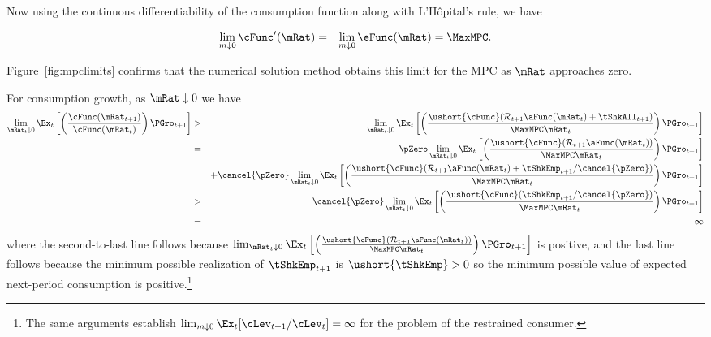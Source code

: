 \documentclass[titlepage]{\econtex}\providecommand{\texname}{BufferStockTheory}%
\begin{document}
{Now using the continuous differentiability of the consumption function
along with L'H\^opital's rule, we have
\begin{comment}
\begin{eqnarray*}
    \eFunc^{\prime}(\mRat) & = & \mRat^{-1} \cFunc^{\prime}(\mRat) - \mRat^{-2} \cFunc(\mRat)
\\ \mRat \eFunc^{\prime}(\mRat) & = & \cFunc^{\prime}(\mRat) - \cFunc(\mRat)/\mRat
\\ \cFunc^{\prime}(\mRat) & = & \eFunc(\mRat)+ \mRat \eFunc^{\prime}(\mRat)
\end{eqnarray*}
and since $0<\eFunc(\mRat)<1$ we have
\end{comment}
\begin{eqnarray}
  \lim_{m \downarrow 0} \cFunc^{\prime}(\mRat) & = & \lim_{m \downarrow 0}
  \eFunc(\mRat) = \MaxMPC. \nonumber
\end{eqnarray}

Figure~\ref{fig:mpclimits} confirms that the numerical solution method
obtains this limit for the MPC as $\mRat$ approaches zero.

For consumption growth, as $\mRat \downarrow 0$ we have
\begin{eqnarray*}
\lim_{\mRat_{t} \downarrow 0} \Ex_{t}\left[\left(\frac{\cFunc({\mRat}_{t+1})}{\cFunc(\mRat_t)}\right){\PGro}_{t+1}\right]
& > & \lim_{\mRat_{t} \downarrow 0} \Ex_{t}\left[\left(\frac{\ushort{\cFunc}({\mathcal{\mathcal{R}}}_{t+1}\aFunc(\mRat_{t})+{%
\tShkAll}_{t+1})}{\MaxMPC \mRat_{t}}\right){\PGro}_{t+1}\right]  \notag \\
& = & \phantom{+}\pZero \lim_{\mRat_{t} \downarrow 0} \Ex_{t}\left[\left(\frac{\ushort{\cFunc}({\mathcal{\mathcal{R}}}_{t+1}\aFunc(\mRat_{t}))}{\MaxMPC \mRat_{t}}\right){\PGro}_{t+1}\right] \\
& & + \cancel{\pZero} \lim_{\mRat_{t} \downarrow 0}  \Ex_{t}\left[\left(\frac{\ushort{\cFunc}({\mathcal{\mathcal{R}}}_{t+1}\aFunc(\mRat_{t})+
\tShkEmp_{t+1}/\cancel{\pZero})}{\MaxMPC \mRat_{t}}\right){\PGro}_{t+1}\right]  \\\notag
& > & \cancel{\pZero} \lim_{\mRat_{t} \downarrow 0} \Ex_{t}\left[\left(\frac{\ushort{\cFunc}(
\tShkEmp_{t+1}/\cancel{\pZero})}{\MaxMPC \mRat_{t}}\right){\PGro}_{t+1}\right] \\
& = & \infty \nonumber
\end{eqnarray*}
where the second-to-last line follows because  $\lim_{\mRat_{t} \downarrow 0} \Ex_{t}\left[\left(\frac{\ushort{\cFunc}({\mathcal{\mathcal{R}}}_{t+1}\aFunc(\mRat_{t}))}{\MaxMPC \mRat_{t}}\right){\PGro}_{t+1}\right]$ is positive, and the last line follows because the minimum possible realization of $\tShkEmp_{t+1}$ is $\ushort{\tShkEmp}>0$ so the minimum possible value of expected next-period consumption is positive.\footnote{
The same arguments establish $\lim_{m \downarrow 0} \Ex_{t}[\cLev_{t+1}/\cLev_{t}] = \infty$
for the problem of the restrained consumer.%
}

}
\end{document}
